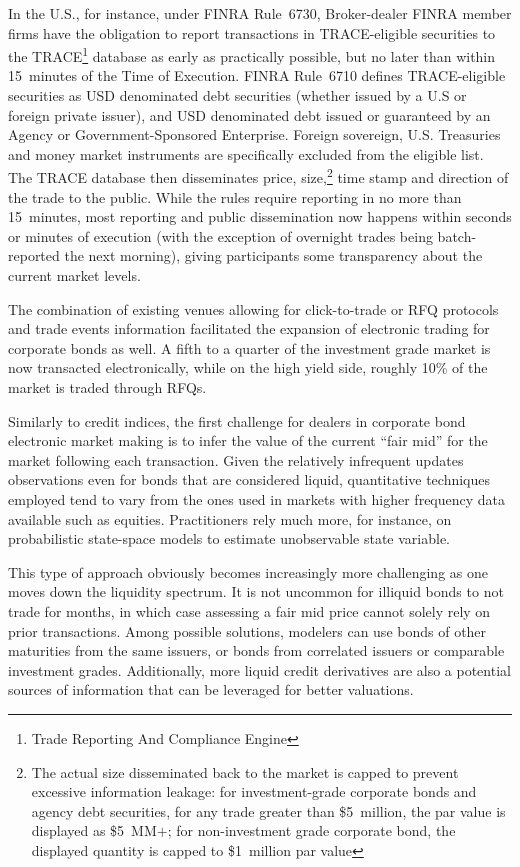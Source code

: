 \begin{enumerate}
In the U.S., for instance, under FINRA Rule~6730, Broker-dealer FINRA member firms have the obligation to report transactions in TRACE-eligible securities to the TRACE\footnote{Trade Reporting And Compliance Engine} database as early as practically possible, but no later than within 15~minutes of the Time of Execution. FINRA Rule~6710 defines TRACE-eligible securities as USD denominated debt securities (whether issued by a U.S or foreign private issuer), and USD denominated debt issued or guaranteed by an Agency or Government-Sponsored Enterprise. Foreign sovereign, U.S. Treasuries and money market instruments are specifically excluded from the eligible list. The TRACE database then disseminates price, size,\footnote{The actual size disseminated back to the market is capped to prevent excessive information leakage: for investment-grade corporate bonds and agency debt securities, for any trade greater than \$5~million, the par value is displayed as \$5~MM$+$; for non-investment grade corporate bond, the displayed quantity is capped to \$1~million par value} time stamp and direction of the trade to the public. While the rules require reporting in no more than 15~minutes, most reporting and public dissemination now happens within seconds or minutes of execution (with the exception of overnight trades being batch-reported the next morning), giving participants some transparency about the current market levels.


The combination of existing venues allowing for click-to-trade or RFQ protocols and trade events information facilitated the expansion of electronic trading for corporate bonds as well. A fifth to a quarter of the investment grade market is now transacted electronically, while on the high yield side, roughly 10\% of the market is traded through RFQs.


Similarly to credit indices, the first challenge for dealers in corporate bond electronic market making is to infer the value of the current ``fair mid'' for the market following each transaction. Given the relatively infrequent updates observations even for bonds that are considered liquid, quantitative techniques employed tend to vary from the ones used in markets with higher frequency data available such as equities. Practitioners rely much more, for instance, on probabilistic state-space models to estimate unobservable state variable.


This type of approach obviously becomes increasingly more challenging as one moves down the liquidity spectrum. It is not uncommon for illiquid bonds to not trade for months, in which case assessing a fair mid price cannot solely rely on prior transactions. Among possible solutions, modelers can use bonds of other maturities from the same issuers, or bonds from correlated issuers or comparable investment grades. Additionally, more liquid credit derivatives are also a potential sources of information that can be leveraged for better valuations.
\end{enumerate}



